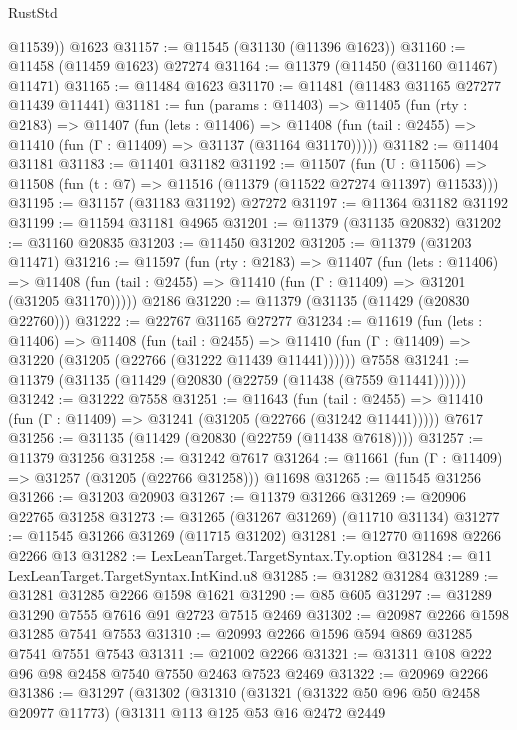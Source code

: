 \begin{lexlean}{RustStd}
\begin{coremodule}
        @11539))
    @1623
@31157 := @11545 (@31130 (@11396 @1623))
@31160 := @11458 (@11459 @1623) @27274
@31164 := @11379 (@11450 (@31160 @11467) @11471)
@31165 := @11484 @1623
@31170 := @11481 (@11483 @31165 @27277 @11439 @11441)
@31181 := fun (params : @11403) =>
  @11405
    (fun (rty : @2183) =>
    @11407
      (fun (lets : @11406) =>
      @11408 (fun (tail : @2455) => @11410 (fun (Γ : @11409) => @31137 (@31164 @31170)))))
@31182 := @11404 @31181
@31183 := @11401 @31182
@31192 := @11507
    (fun (U : @11506) => @11508 (fun (t : @7) => @11516 (@11379 (@11522 @27274 @11397) @11533)))
@31195 := @31157 (@31183 @31192) @27272
@31197 := @11364 @31182 @31192
@31199 := @11594 @31181 @4965
@31201 := @11379 (@31135 @20832)
@31202 := @31160 @20835
@31203 := @11450 @31202
@31205 := @11379 (@31203 @11471)
@31216 := @11597
    (fun (rty : @2183) =>
    @11407
      (fun (lets : @11406) =>
      @11408 (fun (tail : @2455) => @11410 (fun (Γ : @11409) => @31201 (@31205 @31170)))))
    @2186
@31220 := @11379 (@31135 (@11429 (@20830 @22760)))
@31222 := @22767 @31165 @27277
@31234 := @11619
    (fun (lets : @11406) =>
    @11408
      (fun (tail : @2455) =>
      @11410 (fun (Γ : @11409) => @31220 (@31205 (@22766 (@31222 @11439 @11441))))))
    @7558
@31241 := @11379 (@31135 (@11429 (@20830 (@22759 (@11438 (@7559 @11441))))))
@31242 := @31222 @7558
@31251 := @11643
    (fun (tail : @2455) => @11410 (fun (Γ : @11409) => @31241 (@31205 (@22766 (@31242 @11441)))))
    @7617
@31256 := @31135 (@11429 (@20830 (@22759 (@11438 @7618))))
@31257 := @11379 @31256
@31258 := @31242 @7617
@31264 := @11661 (fun (Γ : @11409) => @31257 (@31205 (@22766 @31258))) @11698
@31265 := @11545 @31256
@31266 := @31203 @20903
@31267 := @11379 @31266
@31269 := @20906 @22765 @31258
@31273 := @31265 (@31267 @31269) (@11710 @31134)
@31277 := @11545 @31266 @31269 (@11715 @31202)
@31281 := @12770 @11698 @2266 @2266 @13
@31282 := LexLeanTarget.TargetSyntax.Ty.option
@31284 := @11 LexLeanTarget.TargetSyntax.IntKind.u8
@31285 := @31282 @31284
@31289 := @31281 @31285 @2266 @1598 @1621
@31290 := @85 @605
@31297 := @31289 @31290 @7555 @7616 @91 @2723 @7515 @2469
@31302 := @20987 @2266 @1598 @31285 @7541 @7553
@31310 := @20993 @2266 @1596 @594 @869 @31285 @7541 @7551 @7543
@31311 := @21002 @2266
@31321 := @31311 @108 @222 @96 @98 @2458 @7540 @7550 @2463 @7523 @2469
@31322 := @20969 @2266
@31386 := @31297
    (@31302
      (@31310
        (@31321
          (@31322 @50 @96 @50 @2458 @20977 @11773)
          (@31311
            @113
            @125
            @53
            @16
            @2472
            @2449

\end{coremodule}
\end{lexlean}
